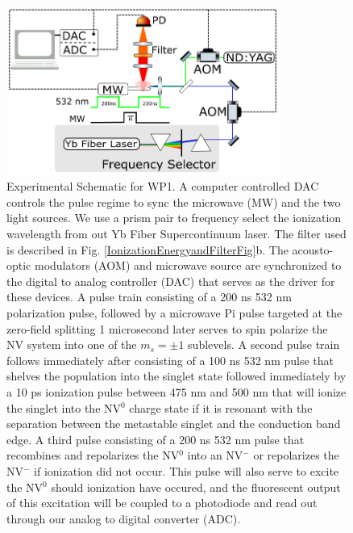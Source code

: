 \documentclass[11pt]{article}
\begin{document}
\begin{figure}
\centering
\includegraphics[width=0.8\textwidth]{Figures/WP1Schematic.png}
\caption{Experimental Schematic for WP1. A computer controlled DAC controls the pulse regime to sync the microwave (MW) and the two light sources. We use a prism pair to frequency select the ionization wavelength from out Yb Fiber Supercontinuum laser. The filter used is described in Fig. \ref{IonizationEnergyandFilterFig}b.  The acousto-optic modulators (AOM) and microwave source are synchronized to the digital to analog controller (DAC) that serves as the driver for these devices.  A pulse train consisting of a 200 ns 532 nm polarization pulse, followed by a microwave Pi pulse targeted at the zero-field splitting 1 microsecond later serves to spin polarize the NV system into one of the $m_s=\pm1$ sublevels.  A second pulse train follows immediately after consisting of a 100 ns 532 nm pulse that shelves the population into the singlet state followed immediately by a 10 ps ionization pulse between 475 nm and 500 nm that will ionize the singlet into the NV$^0$ charge state if it is resonant with the separation between the metastable singlet and the conduction band edge.  A third pulse consisting of a 200 ns 532 nm pulse that recombines and repolarizes the NV$^0$ into an NV$^-$ or repolarizes the NV$^-$ if ionization did not occur.  This pulse will also serve to excite the NV$^0$ should ionization have occured, and the fluorescent output of this excitation will be coupled to a photodiode and read out through our analog to digital converter (ADC).}
\label{WP1Schematic}
\end{figure}
\end{document}
